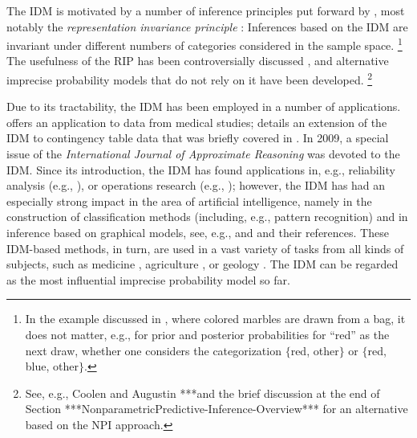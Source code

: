 The IDM is motivated by a number of inference principles put forward by \textcite[\S 1]{1996:walley::idm},
most notably the \emph{representation invariance principle} \parencite[RIP, see][\S 2.9]{1996:walley::idm}:
Inferences based on the IDM are invariant under different numbers of categories considered in the sample space.%
\footnote{In the example discussed in \textcite{1996:walley::idm},
where colored marbles are drawn from a bag,
it does not matter, e.g., for prior and posterior probabilities for ``red'' as the next draw,
whether one considers the categorization $\{$red, other$\}$ or $\{$red, blue, other$\}$.}
The usefulness of the RIP has been controversially discussed \parencite[see, e.g., the discussion to][]{1996:walley::idm},
and alternative imprecise probability models that do not rely on it have been developed.%
\footnote{See, e.g., Coolen and Augustin \parencite*{2005:Coolen:Augustin, 2009:Coolen:Augustin}
***and the brief discussion at the end of Section ***{NonparametricPredictive-Inference-Overview}***
for an alternative based on the NPI approach.}



Due to its tractability, the IDM has been employed in a number of applications.
\textcite{1996:walley::idm} offers an application to data from medical studies;
\textcite{2005:bernard} details an extension of the IDM to contingency table data that was briefly covered in \textcite{1996:walley::idm}.
In 2009, a special issue of the \emph{International Journal of Approximate Reasoning} \parencite{2009:bernard} was devoted to the IDM.
Since its introduction, the IDM has found applications in, e.g.,
reliability analysis (e.g., \cite{1997:Coolen, 2010:utkin:kozine, 2010:utkin:zatenko:coolen, 2011:li:chen:yi:tao}),
or operations research (e.g., \cite{2006:utkin::expertjudgements});
however, the IDM has had an especially strong impact in the area of artificial intelligence,
namely in the construction of classification methods (including, e.g., pattern recognition) and in inference based on graphical models,
see, e.g., \textcite{itip-classification} and \textcite{itip-ipgms} and their references.
These IDM-based methods, in turn, are used in a vast variety of tasks from all kinds of subjects,
such as medicine \parencite[e.g.,][]{2003:zaffalon::dementia},
agriculture \parencite[e.g.,][]{2005:zaffalon::environment},
or geology \parencite[e.g.,][]{2007:antonucci}.
The IDM can be regarded as the most influential imprecise probability model so far.

